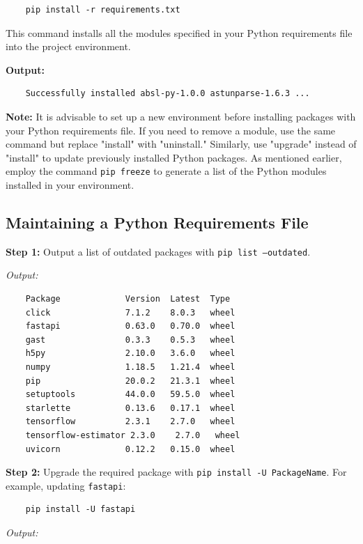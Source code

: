 \begin{verbatim}
	pip install -r requirements.txt
\end{verbatim}

This command installs all the modules specified in your Python requirements file into the project environment.

\textbf{Output:}

\begin{verbatim}
	Successfully installed absl-py-1.0.0 astunparse-1.6.3 ...
\end{verbatim}

\textbf{Note:}
It is advisable to set up a new environment before installing packages with your Python requirements file. If you need to remove a module, use the same command but replace "install" with "uninstall." Similarly, use "upgrade" instead of "install" to update previously installed Python packages. As mentioned earlier, employ the command \texttt{pip freeze} to generate a list of the Python modules installed in your environment.


\subsection{Maintaining a Python Requirements File}

\textbf{Step 1:} Output a list of outdated packages with \texttt{pip list --outdated}.

\textit{Output:}

\begin{verbatim}
	Package             Version  Latest  Type
	click               7.1.2    8.0.3   wheel
	fastapi             0.63.0   0.70.0  wheel
	gast                0.3.3    0.5.3   wheel
	h5py                2.10.0   3.6.0   wheel
	numpy               1.18.5   1.21.4  wheel
	pip                 20.0.2   21.3.1  wheel
	setuptools          44.0.0   59.5.0  wheel
	starlette           0.13.6   0.17.1  wheel
	tensorflow          2.3.1    2.7.0   wheel
	tensorflow-estimator 2.3.0    2.7.0   wheel
	uvicorn             0.12.2   0.15.0  wheel
\end{verbatim}

\textbf{Step 2:} Upgrade the required package with \texttt{pip install -U PackageName}. For example, updating \texttt{fastapi}:

\begin{verbatim}
	pip install -U fastapi
\end{verbatim}

\textit{Output:}

